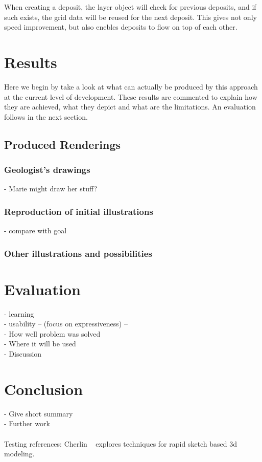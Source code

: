 \documentclass[a4paper,12pt]{article}
\begin{document}
When creating a deposit, the layer object will check for previous deposits, and if such exists, the grid data will be reused for the next deposit. This gives not only speed improvement, but also enebles deposits to flow on top of each other.


\section{Results}
Here we begin by take a look at what can actually be produced by this approach at the current level of development. These results are commented to explain how they are achieved, what they depict and what are the limitations. An evaluation follows in the next section.
\label{sec:results}
\subsection{Produced Renderings}
\subsubsection{Geologist's drawings}
- Marie might draw her stuff?
\subsubsection{Reproduction of initial illustrations}
- compare with goal\\
\subsubsection{Other illustrations and possibilities}

\section{Evaluation}
\label{sec:eval}

- learning\\
- usability
 -- (focus on expressiveness) -- \\
- How well problem was solved\\
- Where it will be used \\
- Discussion

\section{Conclusion}
\label{sec:conclusion}
- Give short summary\\
- Further work\\
\\


Testing references: Cherlin ~\cite{Cherlin:2005:SMF:1090122.1090145} explores techniques for rapid sketch based 3d modeling.


{}

\end{document}
